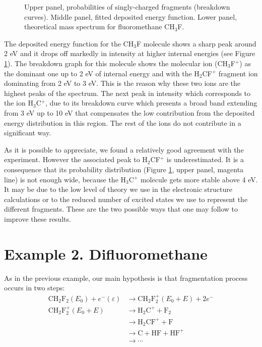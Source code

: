 \documentclass[a4paper,12pt]{article}
\begin{document}
\begin{figure}[hb!]
\caption{\footnotesize{
Upper panel, probabilities of singly-charged fragments (breakdown curves). Middle panel, fitted deposited energy function. Lower panel, theoretical mass 
spectrum for fluoromethane CH$_3$F.
}}
\label{fig: theoretical mass spectrum fluoromethane}
\end{figure}

The deposited energy function for the CH$_3$F molecule shows a sharp peak around 2 eV and it drops off markedly in intensity at higher internal
energies (see Figure \ref{fig: theoretical mass spectrum fluoromethane}). The breakdown graph for this molecule shows the molecular
ion (CH$_3$F$^+$) as the dominant one up to 2 eV of internal energy and with the H$_2$CF$^+$ fragment ion dominating from 2 eV to 3 eV.
This is the reason why these two ions are the highest peaks of the spectrum. The next peak in intensity which corresponds to the ion
H$_3$C$^+$, due to its breakdown curve which presents a broad band extending from 3 eV up to 10 eV that compensates the low
contribution from the deposited energy distribution in this region. The rest of the ions do not contribute in a significant way.

As it is possible to appreciate, we found a relatively good agreement with the experiment. However the associated peak to H$_2$CF$^+$
is underestimated. It is a consequence that its probability distribution (Figure \ref{fig: theoretical mass spectrum fluoromethane},
upper panel, magenta line) is not enough wide, because the H$_3$C$^+$ molecule gets more stable above 4 eV. It may be due to the low
level of theory we use in the electronic structure calculations or to the reduced number of excited states we use
to represent the different fragments. These are the two possible ways that one may follow to improve these results.

\clearpage
\section{Example 2. Difluoromethane}

As in the previous example, our main hypothesis is that fragmentation process occurs in two steps:
\begin{equation}
\begin{aligned}
\text{C}\text{H}_2\text{F}_2(E_0)
+ e^{-}(\varepsilon)
&\rightarrow
\text{C}\text{H}_2\text{F}_2^+(E_0+E) + 2e^-
\\[4mm]
\text{C}\text{H}_2\text{F}_2^+(E_0+E)
&\rightarrow
\text{H}_2\text{C}^+ + \text{F}_2
\\
&\rightarrow
\text{H}_2\text{CF}^+ + \text{F}
\\
&\rightarrow
\text{C} + \text{HF} + \text{HF}^+
\\
&\rightarrow \cdots
\end{aligned}
\end{equation}
\end{document}
